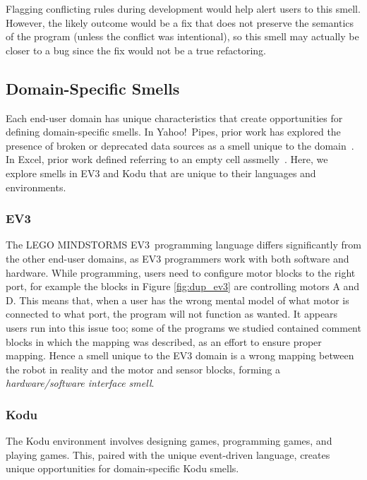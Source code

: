\documentclass[conference]{IEEEtran}
\newcommand{\ms}{LEGO MINDSTORMS EV3}
\begin{document}
Flagging conflicting rules during development would help alert users to this smell. However, the likely outcome would be a fix that does not preserve the semantics of the program (unless the conflict was intentional), so this smell may actually be closer to a bug since the fix would not be a true refactoring. 

\subsection{Domain-Specific Smells}
Each end-user domain has unique characteristics that create opportunities for defining domain-specific smells. In Yahoo!\ Pipes, prior work has explored the presence of broken or deprecated data sources as a smell unique to the domain~\cite{StoleeTSE2013}. In Excel, prior work defined referring to an empty cell assmelly~\cite{cunha2012towards}. Here, we explore smells in EV3 and Kodu that are unique to their languages and environments. 

\subsubsection{EV3}
The \ms~programming language differs significantly from the other end-user domains, as EV3 programmers work with both software and hardware. While programming, users need to configure motor blocks to the right port, for example the blocks in Figure \ref{fig:dup_ev3} are controlling motors A and D. This means that, when a user has the wrong mental model of what motor is connected to what port, the program will not function as wanted. It appears users run into this issue too; some of the programs we studied contained comment blocks in which the mapping was described, as an effort to ensure proper mapping. Hence a smell unique to the EV3 domain is a wrong mapping between the robot in reality and the motor and sensor blocks, forming a \emph{hardware/software interface smell}. 

\subsubsection{Kodu}
The Kodu environment involves designing games, programming games, and playing games. This, paired with the unique event-driven language, creates unique opportunities for domain-specific Kodu smells. 
\end{document}
